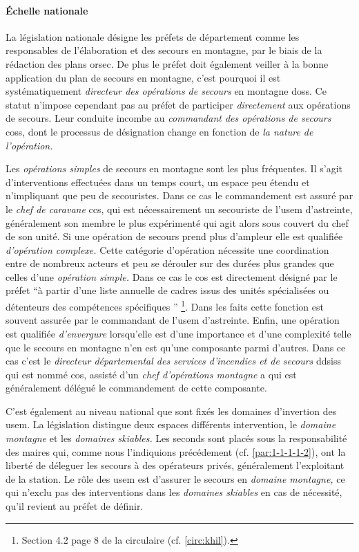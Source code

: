 \paragraph{Échelle nationale}

La législation nationale désigne les préfets de département comme les
responsables de l'élaboration et des secours en montagne, par le biais
de la rédaction des plans \ac{orsec}. De plus le préfet doit également
veiller à la bonne application du plan de secours en montagne, c'est
pourquoi il est systématiquement \emph{directeur des opérations de
  secours} en montagne \acp{dos}. Ce statut n'impose cependant pas au
préfet de participer \emph{directement} aux opérations de
secours. Leur conduite incombe au \emph{commandant des opérations de
  secours} \acp{cos}, dont le processus de désignation change en
fonction de \emph{la nature de l'opération.}

Les \emph{opérations simples} de secours en montagne sont les plus
fréquentes. Il s'agit d'interventions effectuées dans un temps court,
un espace peu étendu et n'impliquant que peu de secouristes. Dans ce
cas le commandement est assuré par le \emph{chef de caravane}
\acp{cc}, qui est nécessairement un secouriste de l'\ac{usem}
d'astreinte, généralement son membre le plus expérimenté qui agit
alors sous couvert du chef de son unité. Si une opération de secours
prend plus d'ampleur elle est qualifiée \emph{d'opération complexe.}
Cette catégorie d'opération nécessite une coordination entre de
nombreux acteurs et peu se dérouler sur des durées plus grandes que
celles d'une \emph{opération simple.} Dans ce cas le \ac{cos} est
directement désigné par le préfet \enquote{à partir d’une liste
  annuelle de cadres issus des unités spécialisées ou détenteurs des
  compétences spécifiques \textelp{}} \footnote{Section 4.2 page 8 de
  la circulaire  (cf. \autoref{circ:khil}).}. Dans les faits
cette fonction est souvent assurée par le commandant de l'\ac{usem}
d'astreinte. Enfin, une opération est qualifiée \emph{d'envergure}
lorsqu'elle est d'une importance et d'une complexité telle que le
secours en montagne n'en est qu'une composante parmi d'autres. Dans ce
cas c'est le \emph{directeur départemental des services d'incendies et
  de secours} \acp{ddsis} qui est nommé \ac{cos}, assisté d'un
\emph{chef d'opérations montagne} a qui est généralement délégué le
commandement de cette composante.

C'est également au niveau national que sont fixés les domaines
d'invertion des \ac{usem}. La législation distingue deux espaces
différents intervention, le \emph{domaine montagne} et les
\emph{domaines skiables.} Les seconds sont placés sous la
responsabilité des maires qui, comme nous l'indiquions précédement
(cf. \autoref{par:1-1-1-1-2}), ont la liberté de déleguer les secours
à des opérateurs privés, généralement l'exploitant de la station. Le
rôle des \ac{usem} est d'assurer le secours en \emph{domaine
  montagne,} ce qui n'exclu pas des interventions dans les
\emph{domaines skiables} en cas de nécessité, qu'il revient au préfet
de définir.


